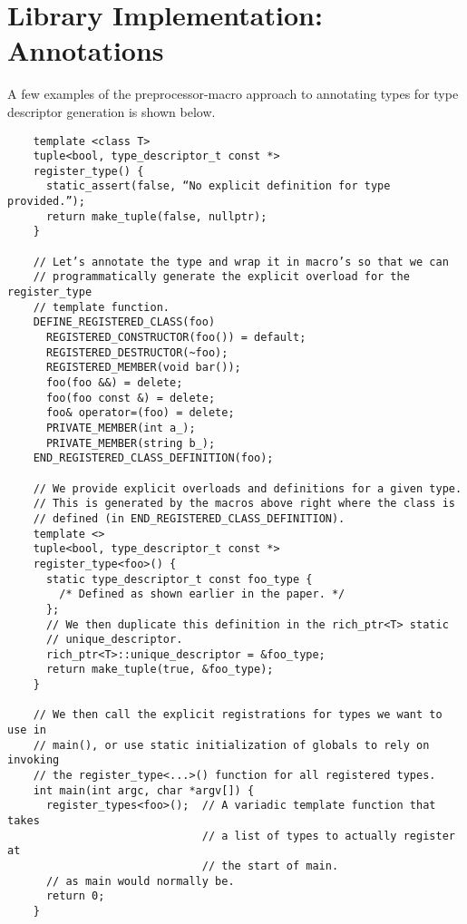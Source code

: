 \section{Library Implementation: Annotations}
\label{appendix:rich_ptr-annotations}

A few examples of the preprocessor-macro approach to annotating types for type descriptor generation is shown below.

\begin{verbatim}
	template <class T>
	tuple<bool, type_descriptor_t const *>
	register_type() {
	  static_assert(false, “No explicit definition for type provided.”);
	  return make_tuple(false, nullptr);
	}

	// Let’s annotate the type and wrap it in macro’s so that we can
	// programmatically generate the explicit overload for the register_type
	// template function.
	DEFINE_REGISTERED_CLASS(foo)
	  REGISTERED_CONSTRUCTOR(foo()) = default;
	  REGISTERED_DESTRUCTOR(~foo);
	  REGISTERED_MEMBER(void bar());
	  foo(foo &&) = delete;
	  foo(foo const &) = delete;
	  foo& operator=(foo) = delete;
	  PRIVATE_MEMBER(int a_);
	  PRIVATE_MEMBER(string b_);
	END_REGISTERED_CLASS_DEFINITION(foo);

	// We provide explicit overloads and definitions for a given type.
	// This is generated by the macros above right where the class is
	// defined (in END_REGISTERED_CLASS_DEFINITION).
	template <>
	tuple<bool, type_descriptor_t const *>
	register_type<foo>() {
	  static type_descriptor_t const foo_type {
	    /* Defined as shown earlier in the paper. */
	  };
	  // We then duplicate this definition in the rich_ptr<T> static
	  // unique_descriptor.
	  rich_ptr<T>::unique_descriptor = &foo_type;
	  return make_tuple(true, &foo_type);
	}

	// We then call the explicit registrations for types we want to use in
	// main(), or use static initialization of globals to rely on invoking
	// the register_type<...>() function for all registered types.
	int main(int argc, char *argv[]) {
	  register_types<foo>();  // A variadic template function that takes 
	                          // a list of types to actually register at
	                          // the start of main.
	  // as main would normally be.
	  return 0;
	}
\end{verbatim}